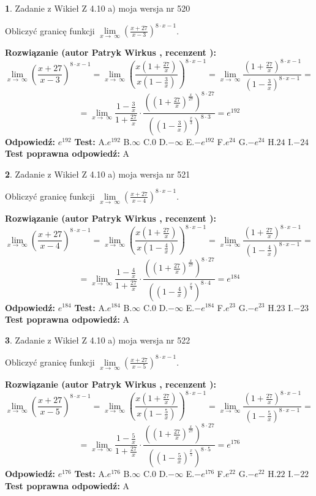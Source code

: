 \documentclass[12pt, a4paper]{article}
\theoremstyle{definition} %
\newtheorem{zad}{}
\newcommand{\zadStart}[1]{\begin{zad}#1\newline}
\newcommand{\zadStop}{\end{zad}}
\newcommand{\rozwStart}[2]{\noindent \textbf{Rozwiązanie (autor #1 , recenzent #2): }\newline}
\newcommand{\rozwStop}{\newline}
\newcommand{\odpStart}{\noindent \textbf{Odpowiedź:}\newline}
\newcommand{\odpStop}{\newline}
\newcommand{\testStart}{\noindent \textbf{Test:}\newline}
\newcommand{\testStop}{\newline}
\newcommand{\kluczStart}{\noindent \textbf{Test poprawna odpowiedź:}\newline}
\newcommand{\kluczStop}{\newline}
\begin{document}
\zadStart{Zadanie z Wikieł Z 4.10 a) moja wersja nr 520}

Obliczyć granicę funkcji  $\lim\limits_{x\to\ \infty}(\frac{x+27}{x-3})^{8\cdot x-1}$.
\zadStop
\rozwStart{Patryk Wirkus}{}
$$\lim\limits_{x\to\ \infty}(\frac{x+27}{x-3})^{8\cdot x-1} = \lim\limits_{x\to\ \infty}(\frac{x(1+\frac{27}{x})}{x(1-\frac{3}{x})})^{8\cdot x-1}=\lim\limits_{x\to\ \infty}\frac{(1+\frac{27}{x})^{8\cdot x-1}}{(1-\frac{3}{x})^{8\cdot x-1}}=$$
$$=\lim\limits_{x\to\ \infty}\frac{1-\frac{3}{x}}{1+\frac{27}{x}}\cdot\frac{((1+\frac{27}{x})^{\frac{x}{27}})^{8\cdot27}}{((1-\frac{3}{x})^{\frac{x}{3}})^{8\cdot3}}=e^{192}$$
\rozwStop
\odpStart
$e^{192}$
\odpStop
\testStart
A.$e^{192}$ B.$\infty$ C.$0$ D.$-\infty$ E.$-e^{192}$
F.$e^{24}$ G.$-e^{24}$
H.$24$
I.$-24$
\testStop
\kluczStart
A
\kluczStop



\zadStart{Zadanie z Wikieł Z 4.10 a) moja wersja nr 521}

Obliczyć granicę funkcji  $\lim\limits_{x\to\ \infty}(\frac{x+27}{x-4})^{8\cdot x-1}$.
\zadStop
\rozwStart{Patryk Wirkus}{}
$$\lim\limits_{x\to\ \infty}(\frac{x+27}{x-4})^{8\cdot x-1} = \lim\limits_{x\to\ \infty}(\frac{x(1+\frac{27}{x})}{x(1-\frac{4}{x})})^{8\cdot x-1}=\lim\limits_{x\to\ \infty}\frac{(1+\frac{27}{x})^{8\cdot x-1}}{(1-\frac{4}{x})^{8\cdot x-1}}=$$
$$=\lim\limits_{x\to\ \infty}\frac{1-\frac{4}{x}}{1+\frac{27}{x}}\cdot\frac{((1+\frac{27}{x})^{\frac{x}{27}})^{8\cdot27}}{((1-\frac{4}{x})^{\frac{x}{4}})^{8\cdot4}}=e^{184}$$
\rozwStop
\odpStart
$e^{184}$
\odpStop
\testStart
A.$e^{184}$ B.$\infty$ C.$0$ D.$-\infty$ E.$-e^{184}$
F.$e^{23}$ G.$-e^{23}$
H.$23$
I.$-23$
\testStop
\kluczStart
A
\kluczStop



\zadStart{Zadanie z Wikieł Z 4.10 a) moja wersja nr 522}

Obliczyć granicę funkcji  $\lim\limits_{x\to\ \infty}(\frac{x+27}{x-5})^{8\cdot x-1}$.
\zadStop
\rozwStart{Patryk Wirkus}{}
$$\lim\limits_{x\to\ \infty}(\frac{x+27}{x-5})^{8\cdot x-1} = \lim\limits_{x\to\ \infty}(\frac{x(1+\frac{27}{x})}{x(1-\frac{5}{x})})^{8\cdot x-1}=\lim\limits_{x\to\ \infty}\frac{(1+\frac{27}{x})^{8\cdot x-1}}{(1-\frac{5}{x})^{8\cdot x-1}}=$$
$$=\lim\limits_{x\to\ \infty}\frac{1-\frac{5}{x}}{1+\frac{27}{x}}\cdot\frac{((1+\frac{27}{x})^{\frac{x}{27}})^{8\cdot27}}{((1-\frac{5}{x})^{\frac{x}{5}})^{8\cdot5}}=e^{176}$$
\rozwStop
\odpStart
$e^{176}$
\odpStop
\testStart
A.$e^{176}$ B.$\infty$ C.$0$ D.$-\infty$ E.$-e^{176}$
F.$e^{22}$ G.$-e^{22}$
H.$22$
I.$-22$
\testStop
\kluczStart
A
\kluczStop
\end{document}
